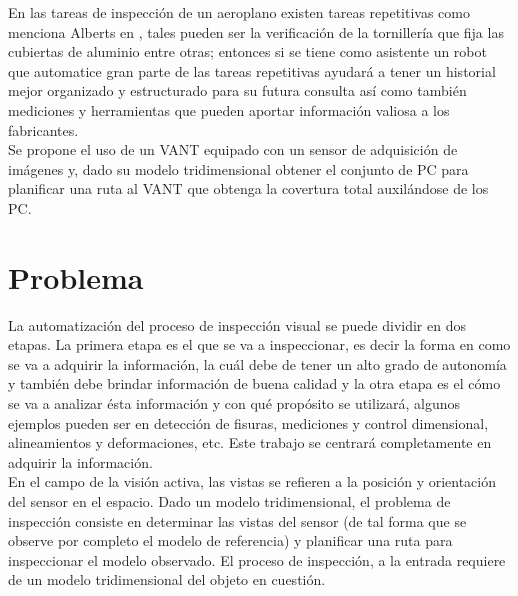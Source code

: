 \documentclass[]{report}
\begin{document}
En las tareas de inspección de un aeroplano existen tareas repetitivas como menciona Alberts en \cite{alberts1998automated}, tales pueden ser la verificación de la tornillería que fija las cubiertas de aluminio entre otras; entonces si se tiene como asistente un robot que automatice gran parte de las tareas repetitivas ayudará a tener un historial mejor organizado y estructurado para su futura consulta así como también mediciones y herramientas que pueden aportar información valiosa a los fabricantes.\\
Se propone el uso de un VANT equipado con un sensor de adquisición de imágenes y, dado su modelo tridimensional obtener el conjunto de PC para planificar una ruta al VANT que obtenga la covertura total auxilándose de los PC.

\section{Problema}

La automatización del proceso de inspección visual se puede dividir en dos etapas. La primera etapa es el que se va a inspeccionar, es decir la forma en como se va a adquirir la información, la cuál debe de tener un alto grado de autonomía y también debe brindar información de buena calidad y la otra etapa es el cómo se va a analizar ésta información y con qué propósito se utilizará, algunos ejemplos pueden ser en detección de fisuras, mediciones y control dimensional, alineamientos y deformaciones, etc. Este trabajo se centrará completamente en adquirir la información.\\
En el campo de la visión activa, las vistas se refieren a la posición y orientación del sensor en el espacio. Dado un modelo tridimensional, el problema de inspección consiste en determinar las vistas del sensor (de tal forma que se observe por completo el modelo de referencia) y planificar una ruta para inspeccionar el modelo observado. El proceso de inspección, a la entrada requiere de un modelo tridimensional del objeto en cuestión.
\end{document}
